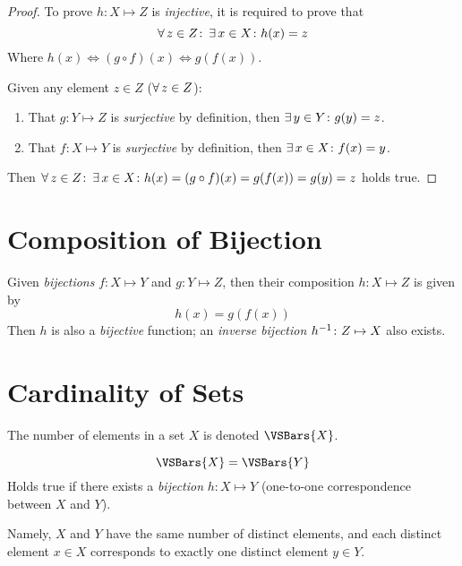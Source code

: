 \begin{proof}
    To prove $h \colon X \mapsto Z$ is \textit{injective}, it is required to prove that
    \begin{equation}
        \operatorname{\forall} z \in Z \colon \operatorname{\exists} x \in X \colon h(x) = z
    \end{equation}
    Where $h(x) \Leftrightarrow (g \circ f)(x) \Leftrightarrow g(f(x))$.
    
    Given any element $z \in Z$ ($\operatorname{\forall} z \in Z$):
    \begin{enumerate}
        \item That $g \colon Y \mapsto Z$ is \textit{surjective} by definition, then $\operatorname{\exists} y \in Y \colon g(y) = z$.
        \item That $f \colon X \mapsto Y$ is \textit{surjective} by definition, then $\operatorname{\exists} x \in X \colon f(x) = y$.
    \end{enumerate}
    Then $\operatorname{\forall} z \in Z \colon \operatorname{\exists} x \in X \colon h(x) = (g \circ f)(x) = g(f(x)) = g(y) = z$ holds true.
\end{proof}

\section{Composition of Bijection}
\begin{proposition}
    Given \textit{bijections} $f \colon X \mapsto Y$ and $g \colon Y \mapsto Z$, then their composition $h \colon X \mapsto Z$ is given by
    \begin{equation}
        h(x) = g(f(x))
    \end{equation}
    Then $h$ is also a \textit{bijective} function; an \textit{inverse bijection} ${h}^{-1} \colon Z \mapsto X$ also exists.
\end{proposition}

\section{Cardinality of Sets}
\begin{definition}[Cardinality]
    The number of elements in a set $X$ is denoted $\VSBars{X}$.
\end{definition}

\begin{definition}
    \begin{equation}
        \VSBars{X} = \VSBars{Y}
    \end{equation}
    Holds true if there exists a \textit{bijection} $h \colon X \mapsto Y$ (one-to-one correspondence between $X$ and $Y$).
    
    Namely, $X$ and $Y$ have the same number of distinct elements, and each distinct element $x \in X$ corresponds to exactly one distinct element $y \in Y$.
\end{definition}

